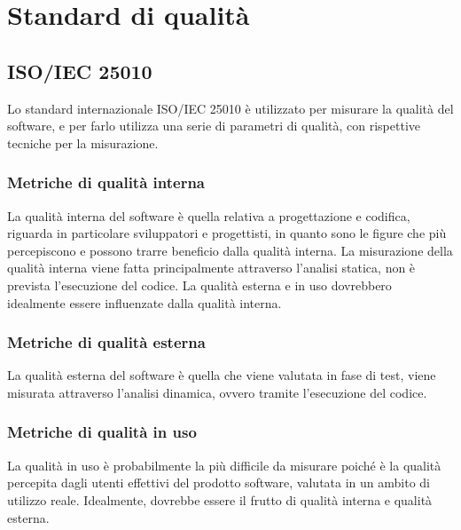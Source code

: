 \section{Standard di qualità}
	\subsection{ISO/IEC 25010}
		Lo standard internazionale ISO/IEC 25010 è utilizzato per misurare la qualità del software, e per farlo utilizza una serie di parametri di qualità, con rispettive tecniche per la misurazione.
		\subsubsection{Metriche di qualità interna}
			La qualità interna del software è quella relativa a progettazione e codifica, riguarda in particolare sviluppatori e progettisti, in quanto sono le figure che più percepiscono e possono trarre beneficio dalla qualità interna.
			La misurazione della qualità interna viene fatta principalmente attraverso l'analisi statica, non è prevista l'esecuzione del codice.
			La qualità esterna e in uso dovrebbero idealmente essere influenzate dalla qualità interna.
		\subsubsection{Metriche di qualità esterna}
			La qualità esterna del software è quella che viene valutata in fase di test, viene misurata attraverso l'analisi dinamica, ovvero tramite l'esecuzione del codice.
		\subsubsection{Metriche di qualità in uso}
			La qualità in uso è probabilmente la più difficile da misurare poiché è la qualità percepita dagli utenti effettivi del prodotto software, valutata in un ambito di utilizzo reale.
			Idealmente, dovrebbe essere il frutto di qualità interna e qualità esterna.
